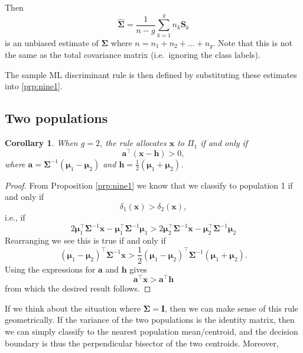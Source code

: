 \documentclass[
]{book}
\newtheorem{corollary}{Corollary}[chapter]
\theoremstyle{definition}
\theoremstyle{definition}
\theoremstyle{definition}
\theoremstyle{definition}
\theoremstyle{remark}
\begin{document}
Then
\begin{equation}
\widehat{\boldsymbol{\Sigma}} = \frac{1}{n-g} \sum_{k=1}^g n_k \mathbf S_k \label{eq:ldawithin}
 \end{equation}
is an unbiased estimate of \(\boldsymbol{\Sigma}\) where \(n = n_1 + n_2 + \ldots + n_g\). Note that this is not the same as the total covariance matrix (i.e.~ignoring the class labels).

The sample ML discriminant rule is then defined by substituting these estimates into \ref{prp:nine1}.

\subsection{Two populations}\label{two-populations}

\begin{corollary}
\protect\hypertarget{cor:nine2c}{}\label{cor:nine2c}When \(g=2\), the rule allocates \(\mathbf x\) to \(\Pi_1\) if and only if
\[\mathbf a^\top (\mathbf x- \mathbf h) > 0, \]
where \(\mathbf a= \boldsymbol{\Sigma}^{-1} ({\boldsymbol{\mu}}_1 - {\boldsymbol{\mu}}_2)\) and \(\mathbf h= \frac{1}{2} ({\boldsymbol{\mu}}_1 + {\boldsymbol{\mu}}_2)\).
\end{corollary}

\begin{proof}
From Proposition \ref{prp:nine1} we know that we classify to population 1 if and only if
\[\delta_1(\mathbf x)>\delta_2(\mathbf x),\]
i.e., if
\[2{\boldsymbol{\mu}}_1^\top \boldsymbol{\Sigma}^{-1} \mathbf x-{\boldsymbol{\mu}}_1^\top\boldsymbol{\Sigma}^{-1}{\boldsymbol{\mu}}_1> 2{\boldsymbol{\mu}}_2^\top \boldsymbol{\Sigma}^{-1} \mathbf x-{\boldsymbol{\mu}}_2^\top \boldsymbol{\Sigma}^{-1}{\boldsymbol{\mu}}_2\]
Rearranging we see this is true if and only if
\[({\boldsymbol{\mu}}_1-{\boldsymbol{\mu}}_2)^\top \boldsymbol{\Sigma}^{-1} \mathbf x> \frac{1}{2}({\boldsymbol{\mu}}_1-{\boldsymbol{\mu}}_2)^\top\boldsymbol{\Sigma}^{-1}({\boldsymbol{\mu}}_1+{\boldsymbol{\mu}}_2).\]
Using the expressions for \(\mathbf a\) and \(\mathbf h\) gives
\[\mathbf a^\top \mathbf x> \mathbf a^\top \mathbf h\]
from which the desired result follows.
\end{proof}

If we think about the situation where \(\boldsymbol{\Sigma}= \mathbf I\), then we can make sense of this rule geometrically. If the variance of the two populations is the identity matrix, then we can simply classify to the nearest population mean/centroid, and the decision boundary is thus the perpendicular bisector of the two centroids. Moreover,
\end{document}
